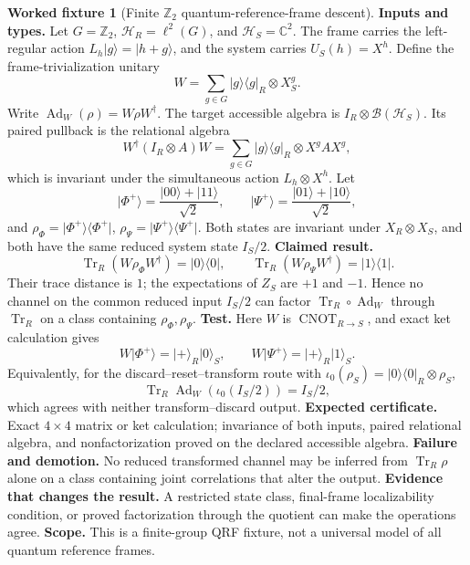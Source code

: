 \documentclass[11pt,a4paper]{article}
\theoremstyle{definition}
\newtheorem{fixture}[definition]{Worked fixture}
\theoremstyle{plain}
\theoremstyle{remark}
\newcommand{\Tr}{\operatorname{Tr}}
\begin{document}
\begin{fixture}[Finite \(\mathbb Z_2\) quantum-reference-frame descent]
\label{fix:qrf}
\textbf{Inputs and types.}
Let \(G=\mathbb Z_2\), \(\mathcal H_R=\ell^2(G)\), and
\(\mathcal H_S=\mathbb C^2\).  The frame carries the left-regular action
\(L_h|g\rangle=|h+g\rangle\), and the system carries
\(U_S(h)=X^h\).  Define the frame-trivialization unitary
\[
W=\sum_{g\in G}|g\rangle\langle g|_R\otimes X_S^g .
\]
Write \(\operatorname{Ad}_W(\rho)=W\rho W^\dagger\).
The target accessible algebra is
\(I_R\otimes\mathcal B(\mathcal H_S)\).  Its paired pullback is the relational
algebra
\[
W^\dagger(I_R\otimes A)W
=\sum_{g\in G}|g\rangle\langle g|_R\otimes X^gAX^g,
\]
which is invariant under the simultaneous action \(L_h\otimes X^h\).
Let
\[
\lvert\Phi^+\rangle
=\frac{\lvert00\rangle+\lvert11\rangle}{\sqrt2},\qquad
\lvert\Psi^+\rangle
=\frac{\lvert01\rangle+\lvert10\rangle}{\sqrt2},
\]
and
\(\rho_\Phi=\lvert\Phi^+\rangle\langle\Phi^+\rvert\),
\(\rho_\Psi=\lvert\Psi^+\rangle\langle\Psi^+\rvert\).
Both states are invariant under \(X_R\otimes X_S\), and both have the same
reduced system state \(I_S/2\).
\textbf{Claimed result.}
\[
\Tr_R(W\rho_\Phi W^\dagger)=\lvert0\rangle\langle0\rvert,\qquad
\Tr_R(W\rho_\Psi W^\dagger)=\lvert1\rangle\langle1\rvert.
\]
Their trace distance is \(1\); the expectations of \(Z_S\) are \(+1\) and
\(-1\).  Hence no channel on the common reduced input \(I_S/2\) can factor
\(\Tr_R\circ\operatorname{Ad}_W\) through \(\Tr_R\) on a class containing
\(\rho_\Phi,\rho_\Psi\).
\textbf{Test.}  Here \(W\) is
\(\operatorname{CNOT}_{R\to S}\), and exact ket calculation gives
\[
W\lvert\Phi^+\rangle=\lvert+\rangle_R\lvert0\rangle_S,\qquad
W\lvert\Psi^+\rangle=\lvert+\rangle_R\lvert1\rangle_S .
\]
Equivalently, for the
discard--reset--transform route with
\(\iota_0(\rho_S)=|0\rangle\langle0|_R\otimes\rho_S\),
\[
\Tr_R\operatorname{Ad}_W(\iota_0(I_S/2))=I_S/2,
\]
which agrees with neither transform--discard output.
\textbf{Expected certificate.}  Exact \(4\times4\) matrix or ket calculation;
invariance of both inputs, paired relational algebra, and nonfactorization
proved on the declared accessible algebra.
\textbf{Failure and demotion.}  No reduced transformed channel may be inferred
from \(\Tr_R\rho\) alone on a class containing joint correlations that alter
the output.  \textbf{Evidence that changes the result.}  A restricted state
class, final-frame localizability condition, or proved factorization through
the quotient can make the operations agree.
\textbf{Scope.}  This is a finite-group QRF fixture, not a universal model of
all quantum reference frames.
\end{fixture}
\end{document}
